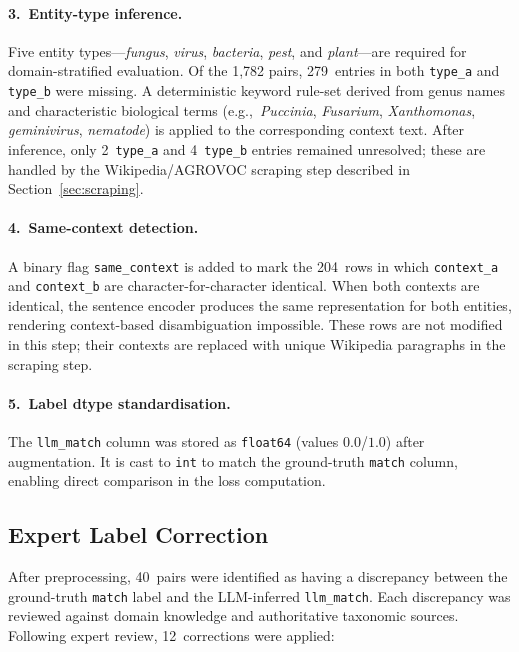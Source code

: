 \paragraph{3.\ Entity-type inference.}
Five entity types---\emph{fungus}, \emph{virus}, \emph{bacteria},
\emph{pest}, and \emph{plant}---are required for domain-stratified
evaluation. Of the 1{,}782 pairs, 279~entries in both \texttt{type\_a}
and \texttt{type\_b} were missing. A deterministic keyword rule-set
derived from genus names and characteristic biological terms
(e.g.,\ \emph{Puccinia}, \emph{Fusarium}, \emph{Xanthomonas},
\emph{geminivirus}, \emph{nematode}) is applied to the corresponding
context text. After inference, only 2~\texttt{type\_a} and
4~\texttt{type\_b} entries remained unresolved; these are handled
by the Wikipedia/AGROVOC scraping step described in
Section~\ref{sec:scraping}.

\paragraph{4.\ Same-context detection.}
A binary flag \texttt{same\_context} is added to mark the 204~rows
in which \texttt{context\_a} and \texttt{context\_b} are
character-for-character identical. When both contexts are identical,
the sentence encoder produces the same representation for both
entities, rendering context-based disambiguation impossible. These
rows are not modified in this step; their contexts are replaced with
unique Wikipedia paragraphs in the scraping step.

\paragraph{5.\ Label dtype standardisation.}
The \texttt{llm\_match} column was stored as \texttt{float64}
(values $0.0$/$1.0$) after augmentation. It is cast to \texttt{int}
to match the ground-truth \texttt{match} column, enabling direct
comparison in the loss computation.

\subsection{Expert Label Correction}
\label{sec:label_correction}

After preprocessing, 40~pairs were identified as having a discrepancy
between the ground-truth \texttt{match} label and the LLM-inferred
\texttt{llm\_match}. Each discrepancy was reviewed against domain
knowledge and authoritative taxonomic sources. Following expert review,
12~corrections were applied:

